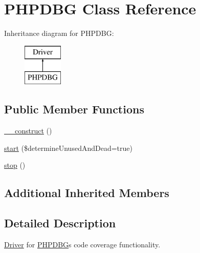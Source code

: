 \hypertarget{class_sebastian_bergmann_1_1_code_coverage_1_1_driver_1_1_p_h_p_d_b_g}{}\section{P\+H\+P\+D\+BG Class Reference}
\label{class_sebastian_bergmann_1_1_code_coverage_1_1_driver_1_1_p_h_p_d_b_g}
Inheritance diagram for P\+H\+P\+D\+BG\+:\begin{figure}[H]
\begin{center}
\leavevmode
\includegraphics[height=2.000000cm]{class_sebastian_bergmann_1_1_code_coverage_1_1_driver_1_1_p_h_p_d_b_g}
\end{center}
\end{figure}
\subsection*{Public Member Functions}
\begin{DoxyCompactItemize}
\item 
\mbox{\hyperlink{class_sebastian_bergmann_1_1_code_coverage_1_1_driver_1_1_p_h_p_d_b_g_a095c5d389db211932136b53f25f39685}{\+\_\+\+\_\+construct}} ()
\item 
\mbox{\hyperlink{class_sebastian_bergmann_1_1_code_coverage_1_1_driver_1_1_p_h_p_d_b_g_aa3dfff26cb483c3eadbf2418e1729671}{start}} (\$determine\+Unused\+And\+Dead=true)
\item 
\mbox{\hyperlink{class_sebastian_bergmann_1_1_code_coverage_1_1_driver_1_1_p_h_p_d_b_g_a8b6fc76a620d7557d06e9a11a9ffb509}{stop}} ()
\end{DoxyCompactItemize}
\subsection*{Additional Inherited Members}


\subsection{Detailed Description}
\mbox{\hyperlink{interface_sebastian_bergmann_1_1_code_coverage_1_1_driver_1_1_driver}{Driver}} for \mbox{\hyperlink{class_sebastian_bergmann_1_1_code_coverage_1_1_driver_1_1_p_h_p_d_b_g}{P\+H\+P\+D\+BG}}\textquotesingle{}s code coverage functionality.

